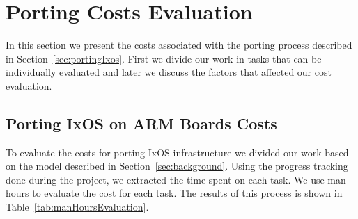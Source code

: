 \newcommand\multirowline[1]{\begin{tabular}{@{}c@{}}#1\end{tabular}}

\section{Porting Costs Evaluation} \label{sec:eval}

%
%
%

In this section we present the costs associated with the porting process
described in Section~\ref{sec:portingIxos}. First we divide our work in tasks
that can be individually evaluated and later we discuss the factors that
affected our cost evaluation.

\subsection{Porting IxOS on ARM Boards Costs}

To evaluate the costs for porting IxOS infrastructure we divided our work based
on the model described in Section~\ref{sec:background}. Using the progress
tracking done during the project, we extracted the time spent on each task. We
use man-hours to evaluate the cost for each task. The results of this process
is shown in Table~\ref{tab:manHoursEvaluation}.

